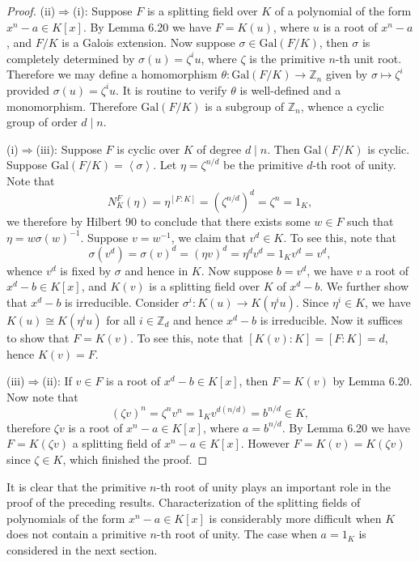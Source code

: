 \begin{proof}
(ii)$\Rightarrow$(i): Suppose $F$ is a splitting field over $K$ of a polynomial of the form $x^n-a\in K[x]$. By Lemma 6.20 we have $F=K(u)$, where $u$ is a root of $x^n-a$, and $F/K$ is a Galois extension. Now suppose $\sigma\in\mathrm{Gal}(F/K)$, then $\sigma$ is completely determined by $\sigma(u)=\zeta^iu$, where $\zeta$ is the primitive $n$-th unit root. Therefore we may define a homomorphism $\theta:\mathrm{Gal}(F/K)\to\mathbb{Z}_n$ given by $\sigma\mapsto\zeta^i$ provided $\sigma(u)=\zeta^iu$. It is routine to verify $\theta$ is well-defined and a monomorphism. Therefore $\mathrm{Gal}(F/K)$ is a subgroup of $\mathbb{Z}_n$, whence a cyclic group of order $d\mid n$.\par
(i)$\Rightarrow$(iii): Suppose $F$ is cyclic over $K$ of degree $d\mid n$. Then $\mathrm{Gal}(F/K)$ is cyclic. Suppose $\mathrm{Gal}(F/K)=\left<\sigma\right>$. Let $\eta=\zeta^{n/d}$ be the primitive $d$-th root of unity. Note that 
$$
N_{K}^{F}\left( \eta \right) =\eta ^{\left[ F:K \right]}=\left( \zeta ^{n/d} \right) ^d=\zeta ^n=1_K,
$$
we therefore by Hilbert 90 to conclude that there exists some $w\in F$ such that $\eta=w\sigma(w)^{-1}$. Suppose $v=w^{-1}$, we claim that $v^d\in K$. To see this, note that 
$$
\sigma \left( v^d \right) =\sigma \left( v \right) ^d=\left( \eta v \right) ^d=\eta ^dv^d=1_Kv^d=v^d,
$$
whence $v^d$ is fixed by $\sigma$ and hence in $K$. Now suppose $b=v^d$, we have $v$ a root of $x^d-b\in K[x]$, and $K(v)$ is a splitting field over $K$ of $x^d-b$. We further show that $x^d-b$ is irreducible. Consider $\sigma^i:K(u)\to K(\eta^iu)$. Since $\eta^i\in K$, we have $K(u)\cong K(\eta^iu)$ for all $i\in\mathbb{Z}_d$ and hence $x^d-b$ is irreducible. Now it suffices to show that $F=K(v)$. To see this, note that $[K(v):K]=[F:K]=d$, hence $K(v)=F$.\par
(iii)$\Rightarrow$(ii): If $v\in F$ is a root of $x^d-b\in K[x]$, then $F=K(v)$ by Lemma 6.20. Now note that 
$$
\left( \zeta v \right) ^n=\zeta ^nv^n=1_Kv^{d\left( n/d \right)}=b^{n/d}\in K,
$$
therefore $\zeta v$ is a root of $x^n-a\in K[x]$, where $a=b^{n/d}$. By Lemma 6.20 we have $F=K(\zeta v)$ a splitting field of $x^n-a\in K[x]$. However $F=K(v)=K(\zeta v)$ since $\zeta\in K$, which finished the proof.
\end{proof}
It is clear that the primitive $n$-th root of unity plays an important role in the proof of the preceding results. Characterization of the splitting fields of polynomials of the form $x^n-a\in K[x]$ is considerably more difficult when $K$ does not contain a primitive $n$-th root of unity. The case when $a=1_K$ is considered in the next section.
